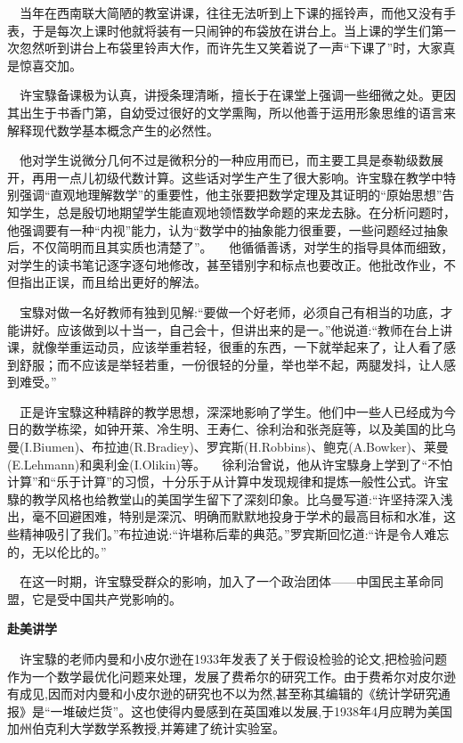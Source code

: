 $\quad$当年在西南联大简陋的教室讲课，往往无法听到上下课的摇铃声，而他又没有手表，于是每次上课时他就将装有一只闹钟的布袋放在讲台上。当上课的学生们第一次忽然听到讲台上布袋里铃声大作，而许先生又笑着说了一声“下课了”时，大家真是惊喜交加。

$\quad$许宝騄备课极为认真，讲授条理清晰，擅长于在课堂上强调一些细微之处。更因其出生于书香门第，自幼受过很好的文学熏陶，所以他善于运用形象思维的语言来解释现代数学基本概念产生的必然性。 

$\quad$他对学生说微分几何不过是微积分的一种应用而已，而主要工具是泰勒级数展开，再用一点儿初级代数计算。这些话对学生产生了很大影响。许宝騄在教学中特别强调“直观地理解数学”的重要性，他主张要把数学定理及其证明的“原始思想”告知学生，总是殷切地期望学生能直观地领悟数学命题的来龙去脉。在分析问题时，他强调要有一种“内视”能力，认为“数学中的抽象能力很重要，一些问题经过抽象后，不仅简明而且其实质也清楚了”。
$\quad$他循循善诱，对学生的指导具体而细致，对学生的读书笔记逐字逐句地修改，甚至错别字和标点也要改正。他批改作业，不但指出正误，而且给出更好的解法。

$\quad$宝騄对做一名好教师有独到见解:“要做一个好老师，必须自己有相当的功底，才能讲好。应该做到以十当一，自己会十，但讲出来的是一。”他说道:“教师在台上讲课，就像举重运动员，应该举重若轻，很重的东西，一下就举起来了，让人看了感到舒服；而不应该是举轻若重，一份很轻的分量，举也举不起，两腿发抖，让人感到难受。”

$\quad$正是许宝騄这种精辟的教学思想，深深地影响了学生。他们中一些人已经成为今日的数学栋梁，如钟开莱、冷生明、王寿仁、徐利治和张尧庭等，以及美国的比乌曼(I.Biumen)、布拉迪(R.Bradiey)、罗宾斯(H.Robbins)、鲍克(A.Bowker)、莱曼(E.Lehmann)和奥利金(I.Olikin)等。
$\quad$徐利治曾说，他从许宝騄身上学到了“不怕计算”和“乐于计算”的习惯，十分乐于从计算中发现规律和提炼一般性公式。许宝騄的教学风格也给教堂山的美国学生留下了深刻印象。比乌曼写道:“许坚持深入浅出，毫不回避困难，特别是深沉、明确而默默地投身于学术的最高目标和水准，这些精神吸引了我们。”布拉迪说:“许堪称后辈的典范。”罗宾斯回忆道:“许是令人难忘的，无以伦比的。” 

$\quad$在这一时期，许宝騄受群众的影响，加入了一个政治团体——中国民主革命同盟，它是受中国共产党影响的。

\textbf{赴美讲学}

$\quad$许宝騄的老师内曼和小皮尔逊在1933年发表了关于假设检验的论文,把检验问题作为一个数学最优化问题来处理，发展了费希尔的研究工作。由于费希尔对皮尔逊有成见,因而对内曼和小皮尔逊的研究也不以为然,甚至称其编辑的《统计学研究通报》是“一堆破烂货”。这也使得内曼感到在英国难以发展,于1938年4月应聘为美国加州伯克利大学数学系教授,并筹建了统计实验室。


